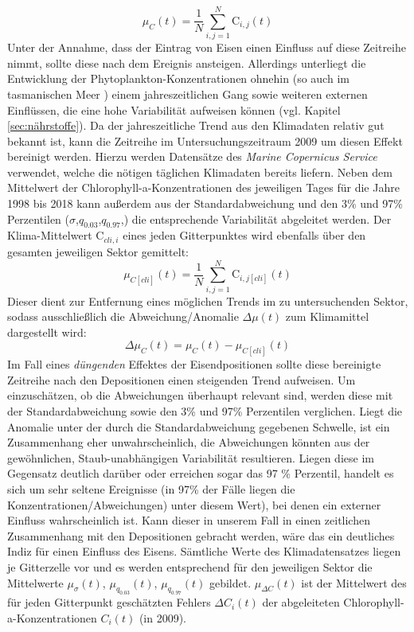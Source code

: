 \documentclass[12pt,a4paper,onecolumn]{scrartcl}
\begin{document}
\begin{equation}
\mu_C(t) = \frac{1}{N}\sum\limits_{i,j=1}^{N} \text{C}_{i,j}(t)
\end{equation}
Unter der Annahme, dass der Eintrag von Eisen einen Einfluss auf diese Zeitreihe nimmt, sollte diese nach dem Ereignis ansteigen. Allerdings unterliegt die Entwicklung der Phytoplankton-Konzentrationen ohnehin (so auch im tasmanischen Meer \citep{Tilburg.2002}) einem jahreszeitlichen Gang sowie weiteren externen Einflüssen, die eine hohe Variabilität aufweisen können (vgl. Kapitel \ref{sec:nährstoffe}). Da der jahreszeitliche Trend aus den Klimadaten relativ gut bekannt ist, kann die Zeitreihe im Untersuchungszeitraum 2009 um diesen Effekt bereinigt werden. Hierzu werden Datensätze des \textit{Marine Copernicus Service} verwendet, welche die nötigen täglichen Klimadaten bereits liefern. Neben dem Mittelwert der Chlorophyll-a-Konzentrationen des jeweiligen Tages für die Jahre 1998 bis 2018 kann außerdem aus der Standardabweichung und den 3\% und 97\% Perzentilen ($\sigma$,$q_{0.03}$,$q_{0.97}$,) die entsprechende Variabilität abgeleitet werden. Der Klima-Mittelwert $\text{C}_{cli,i}$ eines jeden Gitterpunktes wird ebenfalls über den gesamten jeweiligen Sektor gemittelt:
\begin{equation}
\mu_{C[cli]}(t) = \frac{1}{N}\sum\limits_{i,j=1}^{N} \text{C}_{i,j[cli]}(t)
\end{equation}
Dieser dient zur Entfernung eines möglichen Trends im zu untersuchenden Sektor, sodass ausschließlich die Abweichung/Anomalie $\Delta \mu(t)$ zum Klimamittel dargestellt wird:
\begin{equation}
\Delta \mu_C(t) = \mu_C(t) - \mu_{C[cli]}(t) \label{eq:cli_anomalie}
\end{equation} 
Im Fall eines \textit{düngenden} Effektes der Eisendpositionen sollte diese bereinigte Zeitreihe nach den Depositionen einen steigenden Trend aufweisen. Um einzuschätzen, ob die Abweichungen überhaupt relevant sind, werden diese mit der Standardabweichung sowie den 3\% und 97\% Perzentilen verglichen. Liegt die Anomalie unter der durch die Standardabweichung gegebenen Schwelle, ist ein Zusammenhang eher unwahrscheinlich, die Abweichungen könnten aus der gewöhnlichen, Staub-unabhängigen Variabilität resultieren. Liegen diese im Gegensatz deutlich darüber oder erreichen sogar das 97 \% Perzentil, handelt es sich um sehr seltene Ereignisse (in 97\% der Fälle liegen die Konzentrationen/Abweichungen) unter diesem Wert), bei denen ein externer Einfluss wahrscheinlich ist. Kann dieser in unserem Fall in einen zeitlichen Zusammenhang mit den Depositionen gebracht werden, wäre das ein deutliches Indiz für einen Einfluss des Eisens. Sämtliche Werte des Klimadatensatzes liegen je Gitterzelle vor und es werden entsprechend für den jeweiligen Sektor die Mittelwerte $\mu_\sigma (t)$, $\mu_{q_{0.03}}(t)$, $\mu_{q_{0.97}}(t)$ gebildet. $\mu_{\Delta C}(t)$ ist der Mittelwert des für jeden Gitterpunkt geschätzten Fehlers $ \Delta C_i(t)$ der abgeleiteten Chlorophyll-a-Konzentrationen $C_i(t)$ (in 2009).
\end{document}
